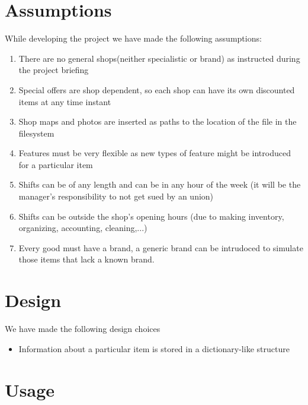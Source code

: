 \documentclass[a4paper]{article}
\begin{document}
\section{Assumptions}
While developing the project we have made the following assumptions:
\begin{enumerate}
	\item There are no general shops(neither specialistic or brand) as instructed during the project briefing
	\item Special offers are shop dependent, so each shop can have its own discounted items at any time instant
	\item Shop maps and photos are inserted as paths to the location of the file in the filesystem
	\item Features must be very flexible as new types of feature might be introduced for a particular item
	\item Shifts can be of any length and can be in any hour of the week (it will be the manager's responsibility to not get sued by an union)
	\item Shifts can be outside the shop's opening hours (due to making inventory, organizing, accounting, cleaning,...)
	\item Every good must have a brand, a generic brand can be intrudoced to simulate those items that lack a known brand.
	
\end{enumerate}

\section{Design}
We have made the following design choices
\begin{itemize}
	\item Information about a particular item is stored in a dictionary-like structure
\end{itemize}

\section{Usage}
\end{document}
